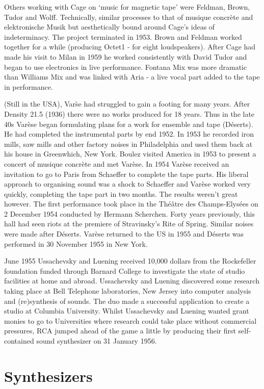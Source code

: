 Others working with Cage on `music for magnetic tape' were Feldman, Brown, Tudor and Wolff. Technically, similar processes to that of musique concr\`ete and elektronische Musik but aesthetically bound around Cage's ideas of indeterminacy. The project terminated in 1953. Brown and Feldman worked together for a while (producing Octet1 - for eight loudspeakers). After Cage had made his visit to Milan in 1959 he worked consistently with David Tudor and began to use electronics in live performance. Fontana Mix was more dramatic than Williams Mix and was linked with Aria - a live vocal part added to the tape in performance.

(Still in the USA), Var\`se had struggled to gain a footing for many years. After Density 21.5 (1936) there were no works produced for 18 years. Thus in the late 40s Var\`ese began formulating plans for a work for ensemble and tape (D\'eserts). He had completed the instrumental parts by end 1952. In 1953 he recorded iron mills, saw mills and other factory noises in Philadelphia and used them back at his house in Greenwhich, New York. Boulez visited America in 1953 to present a concert of musique concr\`ete and met Var\`ese. In 1954 Var\`ese received an invitation to go to Paris from Schaeffer to complete the tape parts. His liberal approach to organising sound was a shock to Schaeffer and Var\`ese worked very quickly, completing the tape part in two months. The results weren't great however. The first performance took place in the Th\'e\^atre des Champs-Elysées on 2 December 1954 conducted by Hermann Scherchen. Forty years previously, this hall had seen riots at the premiere of Stravinsky's Rite of Spring. Similar noises were made after D\'eserts. Var\`ese returned to the US in 1955 and D\'eserts was performed in 30 November 1955 in New York.

June 1955 Ussachevsky and Luening received 10,000 dollars from the Rockefeller foundation funded through Barnard College to investigate the state of studio facilities at home and abroad. Ussachevsky and Luening discovered some research taking place at Bell Telephone laboratories, New Jersey into computer analysis and (re)synthesis of sounds. The duo made a successful application to create a studio at Columbia University. Whilst Ussachevsky and Luening wanted grant monies to go to Universities where research could take place without commercial pressures, RCA jumped ahead of the game a little by producing their first self-contained sound synthesizer on 31 January 1956.

\section{Synthesizers}

